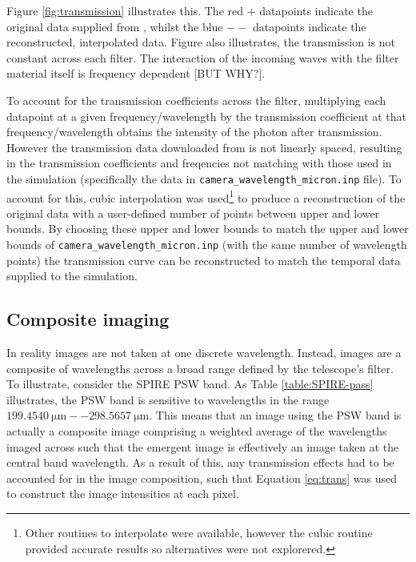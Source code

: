 \documentclass{report}
\begin{document}
Figure \ref{fig:transmission} illustrates this. The red $+$ datapoints indicate the original data supplied from \textcite{pass}, whilst the blue $--$ datapoints indicate the reconstructed, interpolated data. Figure \label{fig:transmissions} also illustrates, the transmission is not constant across each filter. The interaction of the incoming waves with the filter material itself is frequency dependent [BUT WHY?].

To account for the transmission coefficients across the filter, multiplying each datapoint at a given frequency/wavelength by the transmission coefficient at that frequency/wavelength obtains the intensity of the photon after transmission. However the transmission data downloaded from \textcite{pass} is not linearly spaced, resulting in the transmission coefficients and freqencies not matching with those used in the simulation (specifically the data in \texttt{camera\_wavelength\_micron.inp} file). To account for this, cubic interpolation was used\footnote{Other routines to interpolate were available, however the cubic routine provided accurate results so alternatives were not explorered.} to produce a reconstruction of the original data with a user-defined number of points between upper and lower bounds. By choosing these upper and lower bounds to match the upper and lower bounds of \texttt{camera\_wavelength\_micron.inp} (with the same number of wavelength points) the transmission curve can be reconstructed to match the temporal data supplied to the simulation.

\subsection{Composite imaging} \label{comp}
In reality images are not taken at one discrete wavelength. Instead, images are a composite of wavelengths across a broad range defined by the telescope's filter. To illustrate, consider the SPIRE PSW band. As Table \ref{table:SPIRE-pass} illustrates, the PSW band is sensitive to wavelengths in the range $\SI{199.4540}{\micro\meter} --	\SI{298.5657}{\micro\meter}$. This means that an image using the PSW band is actually a composite image comprising a weighted average of the wavelengths imaged across such that the emergent image is effectively an image taken at the central band wavelength. As a result of this, any transmission effects had to be accounted for in the image composition, such that Equation \ref{eq:trans} was used to construct the image intensities at each pixel.
\end{document}
